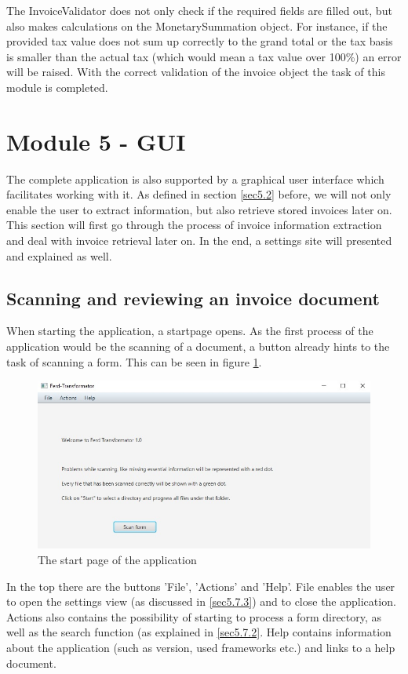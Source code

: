 The InvoiceValidator does not only check if the required fields are filled out, but also makes calculations on the MonetarySummation object. For instance, if the provided tax value does not sum up correctly to the grand total or the tax basis is smaller than the actual tax (which would mean a tax value over 100\%) an error will be raised.
With the correct validation of the invoice object the task of this module is completed. 

\section{Module 5 - GUI}
The complete application is also supported by a graphical user interface which facilitates working with it.
As defined in section \ref{sec5.2} before, we will not only enable the user to extract information, but also retrieve stored invoices later on. This section will first go through the process of invoice information extraction and deal with invoice retrieval later on. In the end, a settings site will presented and explained as well.

\subsection{Scanning and reviewing an invoice document}
\label{sec5.7.1}

When starting the application, a startpage opens. As the first process of the application would be the scanning of a document, a button already hints to the task of scanning a form. This can be seen in figure \ref{startmenu}.
\begin{figure}[ht!]
\centering
\includegraphics[width=\textwidth]{Images/GUI/startmenu.jpg}
\caption{The start page of the application \label{startmenu}}
\end{figure}

In the top there are the buttons 'File', 'Actions' and 'Help'. File enables the user to open the settings view (as discussed in \ref{sec5.7.3}) and to close the application.
Actions also contains the possibility of starting to process a form directory, as well as the search function (as explained in \ref{sec5.7.2}.
Help contains information about the application (such as version, used frameworks etc.) and links to a help document.

